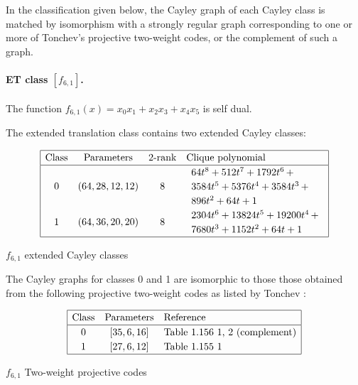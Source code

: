 \documentclass[12pt,a4paper]{article}
\begin{document}
In the classification given below, the Cayley graph of each Cayley class is matched by isomorphism
with a strongly regular graph corresponding to one
or more of Tonchev's projective two-weight codes, or the complement of such a graph.

%
\paragraph*{ET class $[f_{6,1}]$.}
%
The function
$f_{6,1}(x) = x_0 x_1 + x_2 x_3 + x_4 x_5$ is self dual.

The extended translation class contains
two extended Cayley classes:

\begin{table}[!bhpt] %
\small{}
\begin{align*}
\def\arraystretch{1.2}
\begin{array}{|cccl|}
\hline
\text{Class} &
\text{Parameters} &
\text{2-rank} &
\text{Clique polynomial}
\\
\hline
0 &
(64, 28, 12, 12) &
8 &
\begin{array}{l}
64t^{8} + 512t^{7} + 1792t^{6}
\,+
\\
 3584t^{5} + 5376t^{4} + 3584t^{3}
\,+
\\
 896t^{2} + 64t + 1
\end{array}
\\
1 &
(64, 36, 20, 20) &
8 &
\begin{array}{l}
2304t^{6} + 13824t^{5} + 19200t^{4}
\,+
\\
 7680t^{3} + 1152t^{2} + 64t + 1
\end{array}
\\
\hline
\end{array}
\end{align*}
\caption{$f_{6,1}$ extended Cayley classes}
\label{tab-c6_1_EC_classes}
\end{table}

The Cayley graphs for classes 0 and 1 are isomorphic to those those obtained from the following
projective two-weight
codes as listed by Tonchev \cite{Ton07codes}:

\begin{table}[!bhpt] %
\begin{align*}
\def\arraystretch{1.2}
\begin{array}{|ccl|}
\hline
\text{Class} &
\text{Parameters} & \text{Reference}
\\
\hline
0 & [35,6,16] & \text{Table 1.156 1, 2 (complement)}
\\
1 & [27,6,12] & \text{Table 1.155 1 }
\\
\hline
\end{array}
\end{align*}
\caption{$f_{6,1}$ Two-weight projective codes}
\label{tab-c6_1_codes}
\end{table}
\end{document}
